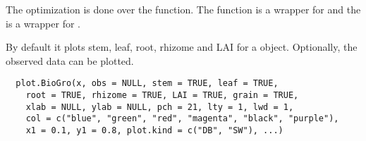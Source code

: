 \documentclass[letterpaper]{book}
\begin{document}
%
\begin{Details}\relax
The optimization is done over the 
function. The  function is a wrapper for
 and the  is a wrapper for
.
\end{Details}
%
\begin{Description}\relax
By default it plots stem, leaf, root, rhizome and LAI for
a  object. Optionally, the observed data can
be plotted.
\end{Description}
%
\begin{Usage}
\begin{verbatim}
  plot.BioGro(x, obs = NULL, stem = TRUE, leaf = TRUE,
    root = TRUE, rhizome = TRUE, LAI = TRUE, grain = TRUE,
    xlab = NULL, ylab = NULL, pch = 21, lty = 1, lwd = 1,
    col = c("blue", "green", "red", "magenta", "black", "purple"),
    x1 = 0.1, y1 = 0.8, plot.kind = c("DB", "SW"), ...)
\end{verbatim}
\end{Usage}
%
\end{document}
